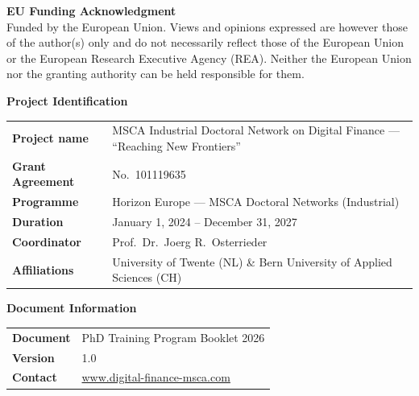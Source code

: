 \thispagestyle{empty}

\vspace*{10mm}

\begin{highlightbox}
\noindent\textbf{EU Funding Acknowledgment}\\[6pt]
Funded by the European Union. Views and opinions expressed are however those of the
author(s) only and do not necessarily reflect those of the European Union or the
European Research Executive Agency (REA). Neither the European Union nor the granting
authority can be held responsible for them.
\end{highlightbox}

\vspace{12mm}

{\sffamily\large\bfseries\color{mscaDarkBlue} Project Identification}

\vspace{6pt}

\begin{tabularx}{\textwidth}{@{}l X@{}}
  \toprule
  \textbf{Project name}   & MSCA Industrial Doctoral Network on Digital Finance ---
                             ``Reaching New Frontiers'' \\[4pt]
  \textbf{Grant Agreement} & No.\ 101119635 \\[4pt]
  \textbf{Programme}       & Horizon Europe --- MSCA Doctoral Networks (Industrial) \\[4pt]
  \textbf{Duration}        & January 1, 2024 -- December 31, 2027 \\[4pt]
  \textbf{Coordinator}     & Prof.\ Dr.\ Joerg R.\ Osterrieder \\[4pt]
  \textbf{Affiliations}    & University of Twente (NL) \&
                             Bern University of Applied Sciences (CH) \\
  \bottomrule
\end{tabularx}

\vspace{12mm}

{\sffamily\large\bfseries\color{mscaDarkBlue} Document Information}

\vspace{6pt}

\begin{tabularx}{\textwidth}{@{}l X@{}}
  \toprule
  \textbf{Document}  & PhD Training Program Booklet 2026 \\[4pt]
  \textbf{Version}   & 1.0 \\[4pt]
  \textbf{Contact}   & \url{www.digital-finance-msca.com} \\
  \bottomrule
\end{tabularx}

\vfill

\begin{center}
  \euFlagPlaceholder
  \hspace{15mm}
  \hspace{10mm}
\end{center}

\vspace{10mm}

\newpage
